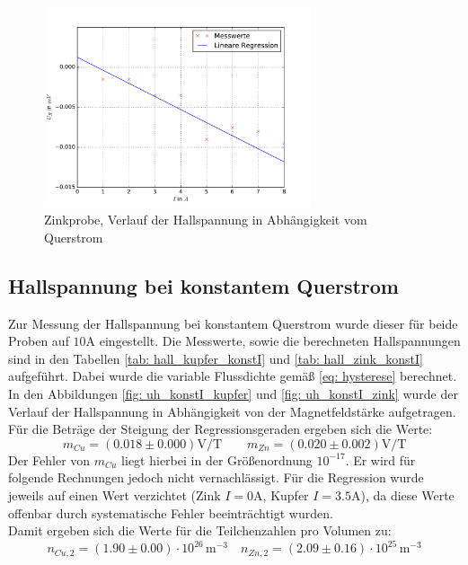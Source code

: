 \begin{figure}
  \centering
  \includegraphics[width=0.7\textwidth]{pics/u_h_zink_konstB.pdf}
  \caption{Zinkprobe, Verlauf der Hallspannung in Abhängigkeit vom Querstrom}
  \label{fig: uh_konstB_zink}
\end{figure}


\subsection{Hallspannung bei konstantem Querstrom}
Zur Messung der Hallspannung bei konstantem Querstrom wurde dieser für beide Proben auf $10\si{\ampere}$ eingestellt. Die%
Messwerte, sowie die berechneten Hallspannungen sind in den Tabellen \ref{tab: hall_kupfer_konstI} und \ref{tab: hall_zink_konstI} aufgeführt. Dabei wurde
die variable Flussdichte gemäß \eqref{eq: hysterese} berechnet. In den Abbildungen \ref{fig: uh_konstI_kupfer} und \ref{fig: uh_konstI_zink}
wurde der Verlauf der Hallspannung in Abhängigkeit von der Magnetfeldstärke aufgetragen. Für die Beträge der Steigung der Regressionsgeraden
ergeben sich die Werte:
\begin{equation}
  m_{Cu} = (0.018 \pm 0.000)\si{\volt \per \tesla }  \quad \quad m_{Zn} = (0.020 \pm 0.002)\si{\volt \per \tesla}%
  \label{eq: steigung_konst_I}
\end{equation}
Der Fehler von $m_{Cu}$ liegt hierbei in der Größenordnung $10^{-17}$. Er wird für folgende Rechnungen jedoch nicht vernachlässigt.
Für die Regression wurde jeweils auf einen Wert verzichtet (Zink $I = 0 \si{\ampere}$, Kupfer $I = 3.5\si{\ampere}$), da diese Werte offenbar
durch systematische Fehler beeinträchtigt wurden.\\
Damit ergeben sich die Werte für die Teilchenzahlen pro Volumen zu:
\begin{equation}
  n_{Cu,2} = (1.90 \pm 0.00)\cdot 10^{26}\,\si{ \meter^{-3}} \quad n_{Zn,2} = (2.09\pm 0.16)\cdot 10^{25}\,\si{ \meter^{-3}}%
\end{equation}

